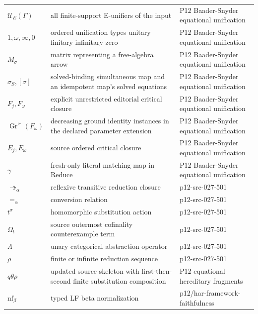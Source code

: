 \begin{longtable}{@{}p{}p{}p{}@{}}
\(\mathcal U_E(\Gamma)\) & all finite-support E-unifiers of the input & P12 Baader-\allowbreak{}Snyder equational unification \\
\(1,\allowbreak \omega,\allowbreak \infty,\allowbreak 0\) & ordered unification types unitary finitary infinitary zero & P12 Baader-\allowbreak{}Snyder equational unification \\
\(M_\sigma\) & matrix representing a free-algebra arrow & P12 Baader-\allowbreak{}Snyder equational unification \\
\(\sigma_S,\allowbreak [\sigma]\) & solved-binding simultaneous map and an idempotent map's solved equations & P12 Baader-\allowbreak{}Snyder equational unification \\
\(F_j,\allowbreak F_\omega\) & explicit unrestricted editorial critical closure & P12 Baader-\allowbreak{}Snyder equational unification \\
\(\operatorname{Gr}^{\succ}(F_\omega)\) & decreasing ground identity instances in the declared parameter extension & P12 Baader-\allowbreak{}Snyder equational unification \\
\(E_j,\allowbreak E_\omega\) & source ordered critical closure & P12 Baader-\allowbreak{}Snyder equational unification \\
\(\gamma\) & fresh-only literal matching map in Reduce & P12 Baader-\allowbreak{}Snyder equational unification \\
\(\twoheadrightarrow_\alpha\) & reflexive transitive reduction closure & p12-\allowbreak{}src-\allowbreak{}027-\allowbreak{}501 \\
\(=_\alpha\) & conversion relation & p12-\allowbreak{}src-\allowbreak{}027-\allowbreak{}501 \\
\(t^\sigma\) & homomorphic substitution action & p12-\allowbreak{}src-\allowbreak{}027-\allowbreak{}501 \\
\(\Omega_t\) & source outermost cofinality counterexample term & p12-\allowbreak{}src-\allowbreak{}027-\allowbreak{}501 \\
\(\Lambda\) & unary categorical abstraction operator & p12-\allowbreak{}src-\allowbreak{}027-\allowbreak{}501 \\
\(\rho\) & finite or infinite reduction sequence & p12-\allowbreak{}src-\allowbreak{}027-\allowbreak{}501 \\
\(q\theta\rho\) & updated source skeleton with first-then-second finite substitution composition & P12 equational hereditary fragments \\
\(\mathrm{nf}_\beta\) & typed LF beta normalization & p12/\allowbreak{}har-\allowbreak{}framework-\allowbreak{}faithfulness \\

\end{longtable}
